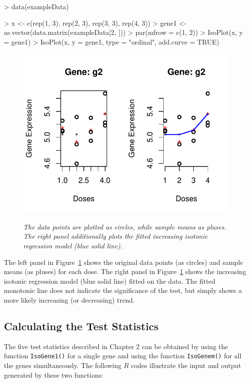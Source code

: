 \documentclass[10pt]{mybook4}
\begin{document}
\begin{Schunk}
\begin{Sinput}
> data(exampleData)
\end{Sinput}
\end{Schunk}



\begin{Schunk}
\begin{Sinput}
> x <- c(rep(1, 3), rep(2, 3), rep(3, 3), rep(4, 3))
> gene1 <- as.vector(data.matrix(exampleData[2, ]))
> par(mfrow = c(1, 2))
> IsoPlot(x, y = gene1)
> IsoPlot(x, y = gene1, type = "ordinal", add.curve = TRUE)
\end{Sinput}
\end{Schunk}
 

\begin{figure}[!h]
\centering
{\includegraphics[width=.6\textwidth]{IsoGene-IsoPlot}}
\caption{\em{The data points are plotted as circles, while sample
means as pluses. The right panel additionally plots the fitted
increasing isotonic regression model (blue solid line).}}
\label{exgene}
\end{figure}


The left panel in Figure~\ref{exgene} shows the original data points
(as circles) and sample means (as pluses) for each dose. The right
panel in Figure~\ref{exgene} shows the increasing isotonic
regression model (blue solid line) fitted on the data. The fitted
monotonic line does not indicate the significance of the test, but
simply shows a more likely increasing (or decreasing) trend.


\subsection{Calculating the Test Statistics}

The five test statistics described in Chapter 2 can be obtained by
using the function \texttt{IsoGene1()} for a single gene and using
the function \texttt{IsoGenem()} for all the genes simultaneously.
The following $R$ codes illustrate the input and output generated by
these two functions:
\end{document}
